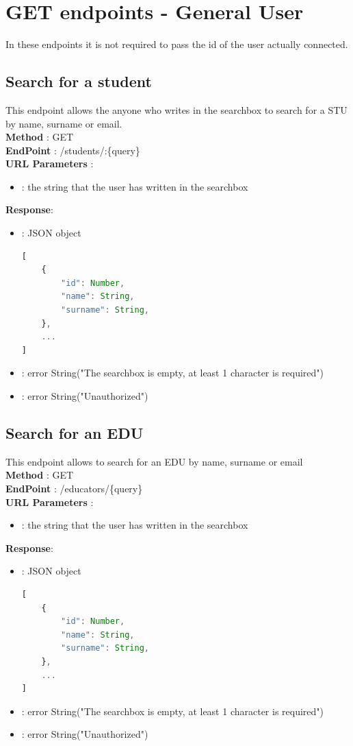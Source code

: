 \section*{GET endpoints - General User}
In these endpoints it is not required to pass the id of the user actually connected.
\subsection*{Search for a student}
This endpoint allows the anyone who writes in the searchbox to search for a STU by name, surname or email.\\
\textbf{Method} : GET \\
\textbf{EndPoint} : /students/:\{query\} \\
\textbf{URL Parameters} :
\begin{itemize}
    \item {} : the string that the user has written in the searchbox
\end{itemize}
\textbf{Response}:
\begin{itemize}
    \item {} : JSON object
          \begin{lstlisting}[language=JavaScript, label={lst:jscode}, basicstyle=\ttfamily]
[
    {
        "id": Number,
        "name": String,
        "surname": String,
    },
    ...
]
            \end{lstlisting}
    \item {} : error String("The searchbox is empty, at least 1 character is required")
    \item {} : error String("Unauthorized")
\end{itemize}


\subsection*{Search for an EDU}
This endpoint allows to search for an EDU by name, surname or email\\
\textbf{Method} : GET \\
\textbf{EndPoint} : /educators/\{query\}  \\
\textbf{URL Parameters} :
\begin{itemize}
    \item {} : the string that the user has written in the searchbox
\end{itemize}
\textbf{Response}:
\begin{itemize}
    \item {} : JSON object
          \begin{lstlisting}[language=JavaScript, label={lst:jscode}, basicstyle=\ttfamily]
[
    {
        "id": Number,
        "name": String,
        "surname": String,
    },
    ...
]
            \end{lstlisting}
    \item {} : error String("The searchbox is empty, at least 1 character is required")
    \item {} : error String("Unauthorized")
\end{itemize}

